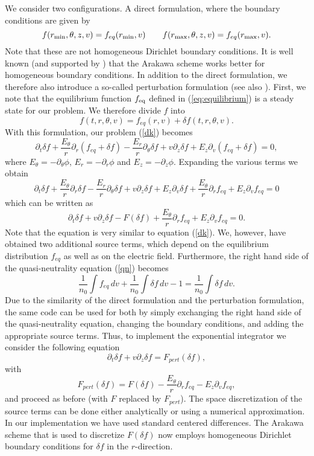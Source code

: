 We consider two configurations. A direct formulation, where the boundary conditions are given by
$$
f(r_{\rm min},\theta ,z,v)=f_{eq}(r_{\rm min},v) \qquad
f(r_{\rm max},\theta ,z,v)=f_{eq}(r_{\rm max},v).
$$
Note that these are not homogeneous Dirichlet boundary conditions. It is well known (and supported by \cite{Crouseilles:2018}) 
that the Arakawa scheme works better for homogeneous boundary conditions. In addition to the direct formulation, we therefore also introduce a so-called perturbation formulation (see also \cite{Crouseilles:2014, Latu:2014}).
First, we note that the equilibrium function $f_{\rm eq}$ defined in (\ref{eq:equilibrium}) is a steady state for our problem. We therefore divide $f$ into
$$
f(t,r,\theta ,v)=f_{eq}(r,v)+\delta f(t,r,\theta ,v).
$$
With this formulation, our problem (\ref{dk}) becomes
$$
\partial_t\delta f+\frac{E_\theta}{r}\partial_r (f_{eq} + \delta f)-\frac{E_r}{r}\partial_\theta \delta f+v\partial_z\delta f+E_z \partial_v (f_{eq} + \delta f)=0,
$$
where $E_\theta=-\partial_\theta \phi$, $E_r=-\partial_r \phi$ and $E_z=-\partial_z \phi$. Expanding the various terms we obtain
$$
\partial_t\delta f+\frac{E_\theta}{r}\partial_r\delta f-\frac{E_r}{r}\partial_\theta \delta f+v\partial_z\delta f+ E_z \partial_v \delta f
+\frac{E_\theta}{r}\partial_r f_{eq} + E_z \partial _v f_{eq}=0
$$
which can be written as
$$
\partial_t\delta f + v\partial_z \delta f -F(\delta f) +\frac{E_\theta}{r}\partial_r f_{eq} +E_z\partial _v f_{eq} = 0.
$$
Note that the equation is very similar to equation (\ref{dk}). We, however, have obtained two additional source terms, which depend on the equilibrium distribution $f_{eq}$ as well as on the electric field.
Furthermore, the right hand side of the quasi-neutrality equation (\ref{qn}) becomes
$$
\frac{1}{n_0}\int f_{eq} \,dv+\frac{1}{n_0}\int \delta f \,dv-1 = \frac{1}{n_0}\int \delta f \,dv.
$$
Due to the similarity of the direct formulation and the perturbation formulation, the same code can 
be used for both by simply exchanging the right hand side of the quasi-neutrality equation, changing the boundary conditions, and adding the appropriate source terms. Thus, to implement the exponential integrator we consider the following equation 
$$ \partial_t\delta f + v\partial_z \delta f  = F_{pert}(\delta f),  $$
with
$$ F_{pert} (\delta f)= F(\delta f) -\frac{E_\theta}{r}\partial_r f_{eq} - E_z\partial _v f_{eq},  $$
and proceed as before (with $F$ replaced by $F_{pert}$). The space discretization of the source terms can be done either analytically or using a numerical approximation. In our implementation we have used standard centered differences. The Arakawa scheme that is used to discretize $F(\delta f)$ now employs homogeneous Dirichlet boundary conditions for $\delta f$ in the $r$-direction.

